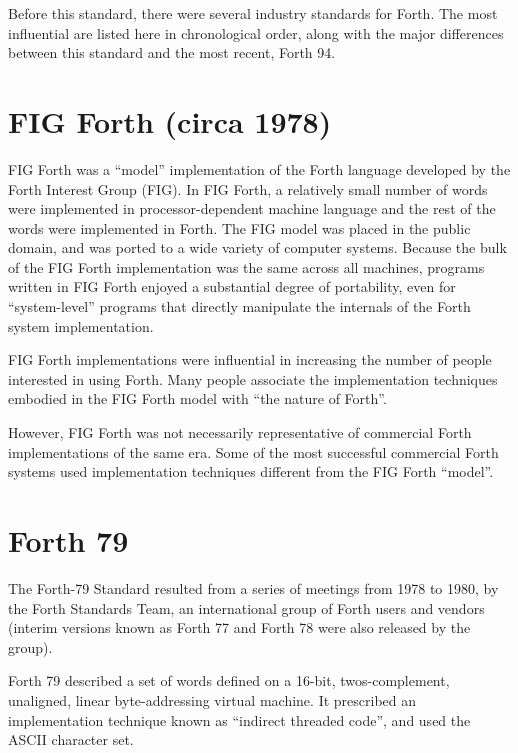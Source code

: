 
\label{annex:diff}

Before this standard, there were several industry standards for Forth.
The most influential are listed here in chronological order, along
with the major differences between this standard and the most recent,
Forth 94.

\section{FIG Forth (circa 1978)} %

FIG Forth was a ``model'' implementation of the Forth language
developed by the Forth Interest Group (FIG). In FIG Forth, a
relatively small number of words were implemented in processor-dependent
machine language and the rest of the words were implemented in Forth.
The FIG model was placed in the public domain, and was ported to a wide
variety of computer systems. Because the bulk of the FIG Forth
implementation was the same across all machines, programs written in
FIG Forth enjoyed a substantial degree of portability, even for
``system-level'' programs that directly manipulate the internals
of the Forth system implementation.

FIG Forth implementations were influential in increasing the number
of people interested in using Forth. Many people associate the
implementation techniques embodied in the FIG Forth model with
``the nature of Forth''.

However, FIG Forth was not necessarily representative of commercial
Forth implementations of the same era. Some of the most successful
commercial Forth systems used implementation techniques different
from the FIG Forth ``model''.


\section{Forth 79} %

The Forth-79 Standard resulted from a series of meetings from 1978
to 1980, by the Forth Standards Team, an international group of Forth
users and vendors (interim versions known as Forth 77 and Forth 78
were also released by the group).

Forth 79 described a set of words defined on a 16-bit, twos-complement,
unaligned, linear byte-addressing virtual machine. It prescribed an
implementation technique known as ``indirect threaded code'', and used
the ASCII character set.

